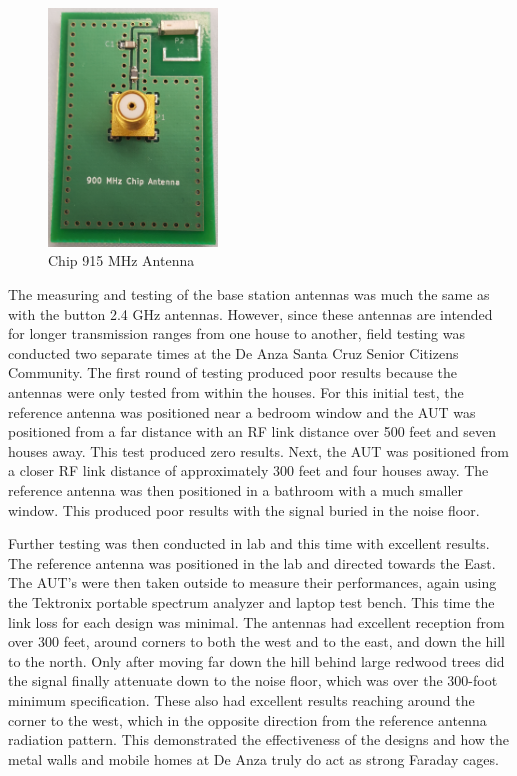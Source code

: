 \documentclass[journal,compsoc]{IEEEtran}
\begin{document}
\begin{figure}[ht]	%
\centering
\includegraphics[width=0.4\textwidth]{900MHzChipAntenna.jpg}
\caption{Chip 915 MHz Antenna}
\label{915 MHz }
\end{figure}

The measuring and testing of the base station antennas was much the same as with the button 2.4 GHz antennas.  However, since these antennas are intended for longer transmission ranges from one house to another, field testing was conducted two separate times at the De Anza Santa Cruz Senior Citizens Community.  The first round of testing produced poor results because the antennas were only tested from within the houses.  For this initial test, the reference antenna was positioned near a bedroom window and the AUT was positioned from a far distance with an RF link distance over 500 feet and seven houses away.  This test produced zero results.  Next, the AUT was positioned from a closer RF link distance of approximately 300 feet and four houses away.  The reference antenna was then positioned in a bathroom with a much smaller window.  This produced poor results with the signal buried in the noise floor.

Further testing was then conducted in lab and this time with excellent results.  The reference antenna was positioned in the lab and directed towards the East.  The AUT’s were then taken outside to measure their performances, again using the Tektronix portable spectrum analyzer and laptop test bench.  This time the link loss for each design was minimal.  The antennas had excellent reception from over 300 feet, around corners to both the west and to the east, and down the hill to the north.  Only after moving far down the hill behind large redwood trees did the signal finally attenuate down to the noise floor, which was over the 300-foot minimum specification.  These also had excellent results reaching around the corner to the west, which in the opposite direction from the reference antenna radiation pattern.  This demonstrated the effectiveness of the designs and how the metal walls and mobile homes at De Anza truly do act as strong Faraday cages.
\end{document}
